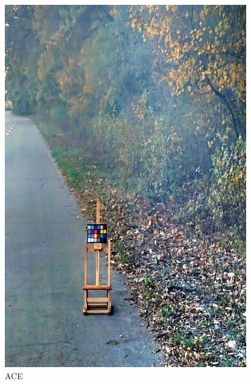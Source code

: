 \documentclass[12pt]{article}
\begin{document}
\begin{figure}[!h]
\begin{minipage}[t]{0.24\linewidth}
        \includegraphics[width=0.9\linewidth]{sample_pictures/after_OHAZY_ACE.jpg}
        \caption*{ACE}
    \end{minipage}\begin{minipage}[t]{0.24\linewidth}
        \centering

\end{minipage}
\end{figure}
\end{document}
